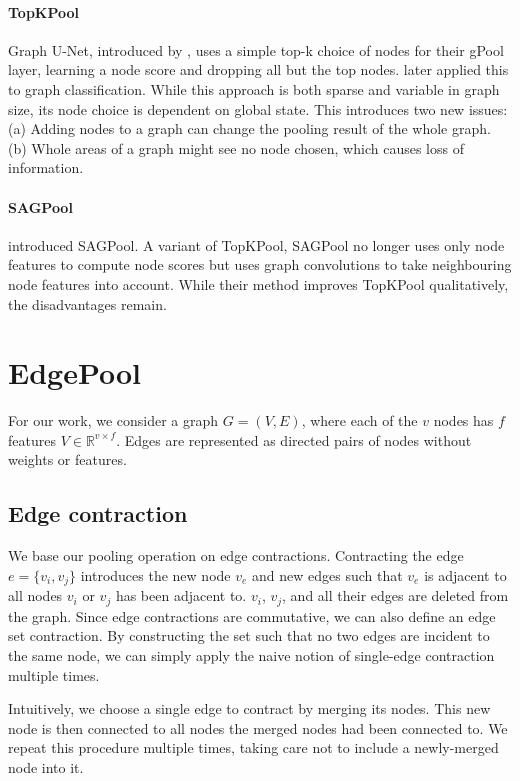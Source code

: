 \documentclass{article}
\newcommand{\edgepool}{EdgePool}
\begin{document}
\paragraph{TopKPool} Graph U-Net, introduced by \citet{gaoGraphUNet2018a}, uses a simple top-k choice of nodes for their gPool layer, learning a node score and dropping all but the top nodes. \citet{cangeaSparseHierarchicalGraph2018a} later applied this  to graph classification. While this approach is both sparse and variable in graph size, its node choice is dependent on global state. This introduces two new issues: (a) Adding nodes to a graph can change the pooling result of the whole graph. (b) Whole areas of a graph might see no node chosen, which causes loss of information. 

\paragraph{SAGPool} \citet{leeSelfAttentionGraphPooling2019} introduced \gls{SAGPool}. A variant of TopKPool, \gls{SAGPool} no longer uses only node features to compute node scores but uses graph convolutions to take neighbouring node features into account. While their method improves TopKPool qualitatively, the disadvantages remain. 
\section{\edgepool{}}

For our work, we consider a graph $G = (V, E)$, where each of the $v$ nodes has $f$ features $V \in \mathbb{R}^{v \times f}$. Edges are represented as directed pairs of nodes without weights or features.

\subsection{Edge contraction}

We base our pooling operation on edge contractions. Contracting the edge $e = \{v_i, v_j\}$ introduces the new node $v_e$ and new edges such that $v_e$ is adjacent to all nodes $v_i$ or $v_j$ has been adjacent to. $v_i$, $v_j$, and all their edges are deleted from the graph. Since edge contractions are commutative, we can also define an edge set contraction. By constructing the set such that no two edges are incident to the same node, we can simply apply the naive notion of single-edge contraction multiple times.

Intuitively, we choose a single edge to contract by merging its nodes. This new node is then connected to all nodes the merged nodes had been connected to. We repeat this procedure multiple times, taking care not to include a newly-merged node into it.
\end{document}
